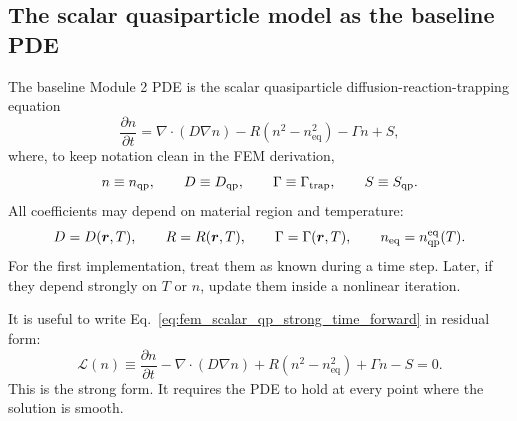 \documentclass[11pt]{article}
\newcommand{\br}{{\bm{r}}}
\newcommand{\trap}{\mathrm{trap}}
\newcommand{\eq}{\mathrm{eq}}
\begin{document}
\subsection{The scalar quasiparticle model as the baseline PDE}
The baseline Module 2 PDE is the scalar quasiparticle diffusion-reaction-trapping equation
\begin{equation}
\frac{\partial n}{\partial t}
=\nabla\cdot(D\nabla n)
-R(n^2-n_{\eq}^2)
-\Gamma n
+S,
\label{eq:fem_scalar_qp_strong_time_forward}
\end{equation}
where, to keep notation clean in the FEM derivation,
\begin{equation}
 n\equiv n_{\qp},\qquad D\equiv D_{\qp},\qquad \Gamma\equiv\Gamma_{\trap},\qquad S\equiv S_{\qp}.
\end{equation}
All coefficients may depend on material region and temperature:
\begin{equation}
D=D(\br,T),\qquad R=R(\br,T),\qquad \Gamma=\Gamma(\br,T),\qquad n_{\eq}=n_{\qp}^{\eq}(T).
\end{equation}
For the first implementation, treat them as known during a time step. Later, if they depend strongly on $T$ or $n$, update them inside a nonlinear iteration.

It is useful to write Eq.~\eqref{eq:fem_scalar_qp_strong_time_forward} in residual form:
\begin{equation}
\mathcal{L}(n)
\equiv
\frac{\partial n}{\partial t}
-\nabla\cdot(D\nabla n)
+R(n^2-n_{\eq}^2)
+\Gamma n
-S
=0.
\label{eq:fem_scalar_qp_residual_strong}
\end{equation}
This is the strong form. It requires the PDE to hold at every point where the solution is smooth.
\end{document}
